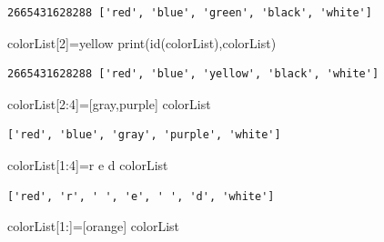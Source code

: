 \documentclass[
  a4paper,
  DIV=11,
  numbers=noendperiod]{scrreprt}
\newenvironment{Shaded}{\begin{snugshade}}{\end{snugshade}}
\newcommand{\BuiltInTok}[1]{\textcolor[rgb]{0.00,0.23,0.31}{#1}}
\newcommand{\DecValTok}[1]{\textcolor[rgb]{0.68,0.00,0.00}{#1}}
\newcommand{\NormalTok}[1]{\textcolor[rgb]{0.00,0.23,0.31}{#1}}
\newcommand{\OperatorTok}[1]{\textcolor[rgb]{0.37,0.37,0.37}{#1}}
\newcommand{\StringTok}[1]{\textcolor[rgb]{0.13,0.47,0.30}{#1}}
\begin{document}
\begin{verbatim}
2665431628288 ['red', 'blue', 'green', 'black', 'white']
\end{verbatim}

\begin{Shaded}
\begin{Highlighting}[]
\NormalTok{colorList[}\DecValTok{2}\NormalTok{]}\OperatorTok{=}\StringTok{\textquotesingle{}yellow\textquotesingle{}}
\BuiltInTok{print}\NormalTok{(}\BuiltInTok{id}\NormalTok{(colorList),colorList)}
\end{Highlighting}
\end{Shaded}

\begin{verbatim}
2665431628288 ['red', 'blue', 'yellow', 'black', 'white']
\end{verbatim}

\begin{Shaded}
\begin{Highlighting}[]
\NormalTok{colorList[}\DecValTok{2}\NormalTok{:}\DecValTok{4}\NormalTok{]}\OperatorTok{=}\NormalTok{[}\StringTok{\textquotesingle{}gray\textquotesingle{}}\NormalTok{,}\StringTok{\textquotesingle{}purple\textquotesingle{}}\NormalTok{]}
\NormalTok{colorList}
\end{Highlighting}
\end{Shaded}

\begin{verbatim}
['red', 'blue', 'gray', 'purple', 'white']
\end{verbatim}

\begin{Shaded}
\begin{Highlighting}[]
\NormalTok{colorList[}\DecValTok{1}\NormalTok{:}\DecValTok{4}\NormalTok{]}\OperatorTok{=}\StringTok{\textquotesingle{}r e d\textquotesingle{}}
\NormalTok{colorList}
\end{Highlighting}
\end{Shaded}

\begin{verbatim}
['red', 'r', ' ', 'e', ' ', 'd', 'white']
\end{verbatim}

\begin{Shaded}
\begin{Highlighting}[]
\NormalTok{colorList[}\DecValTok{1}\NormalTok{:]}\OperatorTok{=}\NormalTok{[}\StringTok{\textquotesingle{}orange\textquotesingle{}}\NormalTok{]}
\NormalTok{colorList}
\end{Highlighting}
\end{Shaded}
\end{document}
